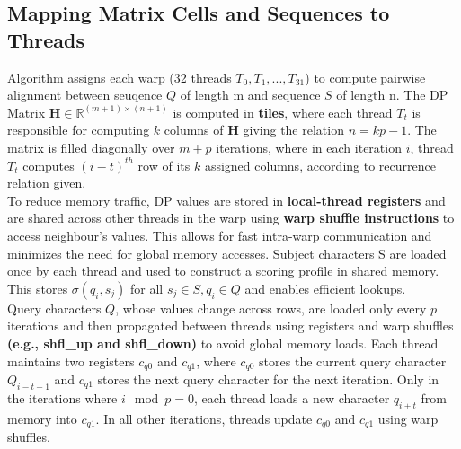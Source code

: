 \documentclass{article}
\begin{document}
\subsection*{Mapping Matrix Cells and Sequences to Threads}
Algorithm assigns each warp (32 threads $T_0,T_1,...,T_{31}$) to compute pairwise alignment between seuqence $Q$ of length m and sequence $S$ of length n. The DP Matrix $\textbf{H} \in \mathbb{R}^{(m+1) \times (n+1)}$ is computed in \textbf{tiles}, where each thread $T_t$ is responsible for computing $k$ columns of $\textbf{H}$ giving the relation $n = kp - 1$. The matrix is filled diagonally over $m+p$ iterations, where in each iteration $i$, thread $T_t$ computes $(i-t)^{th}$ row of its $k$ assigned columns, according to recurrence relation given. \\

To reduce memory traffic, DP values are stored in \textbf{local-thread registers} and are shared across other threads in the warp using \textbf{warp shuffle instructions} to access neighbour's values. This allows for fast intra-warp communication and minimizes the need for global memory accesses.
Subject characters S are loaded once by each thread and used to construct a scoring profile in shared memory. This stores $\sigma(q_i,s_j)$ for all $s_j \in S, q_i \in Q$ and enables efficient lookups. \\

Query characters $Q$, whose values change across rows, are loaded only every $p$ iterations and then propagated between threads using registers and warp shuffles \textbf{(e.g., shfl\_up and shfl\_down)} to avoid global memory loads. Each thread maintains two registers $c_{q0}$ and $c_{q1}$, where $c_{q0}$ stores the current query character $Q_{i-t-1}$ and $c_{q1}$ stores the next query character for the next iteration. Only in the iterations where $i\mod p = 0$, each thread loads a new character $q_{i+t}$ from memory into $c_{q1}$. In all other iterations, threads update $c_{q0}$ and $c_{q1}$ using warp shuffles. 
\end{document}
